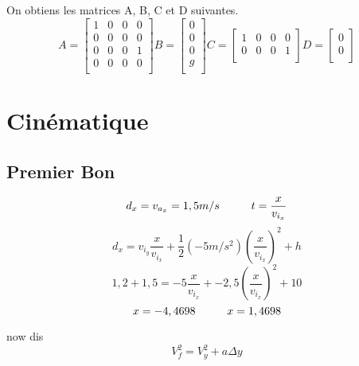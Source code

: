 \documentclass{article}
\begin{document}
\newpage
\noindent
On obtiens les matrices A, B, C et D suivantes.
\begin{equation}
	A = 
  	\begin{bmatrix}
  	1 & 0 & 0 & 0 \\ 
  	0 & 0 & 0 & 0 \\
  	0 & 0 & 0 & 1 \\ 
  	0 & 0 & 0 & 0 \\
  	\end{bmatrix}
  	B = 
  	\begin{bmatrix}
  	0 \\ 
  	0 \\ 
  	0 \\ 
  	g \\
  	\end{bmatrix}
  	C =
  	\begin{bmatrix}
  	1 & 0 & 0 & 0 \\ 
  	0 & 0 & 0 & 1 \\
  	\end{bmatrix}
  	D = 
  	\begin{bmatrix}
  	0 \\ 
  	0 \\
  	\end{bmatrix}
\end{equation}
\section{Cinématique}
\subsection{Premier Bon}
\begin{equation}
	d_{x} = v_{a_{x}} = 1,5 m/s \hspace{10mm} t=\frac{x}{v_{i_{x}}}
\end{equation}
\begin{equation}
	d_{x} = {v_{i_{y}}} \frac{x}{v_{i_{x}}} + \frac{1}{2}(-5 m/s^2)(\frac{x}{v_{i_{x}}})^2 + h
\end{equation}
\begin{equation}
	1,2+1,5 = -5 \frac{x}{v_{i_{x}}} + -2,5(\frac{x}{v_{i_{x}}})^2 + 10
\end{equation}
\begin{equation}
	x = -4,4698 \hspace{10mm}
	x = 1,4698
\end{equation}


now dis
\begin{equation}
V_{f}^2 = V_{y}^2 + a \Delta y
\end{equation}
\end{document}
